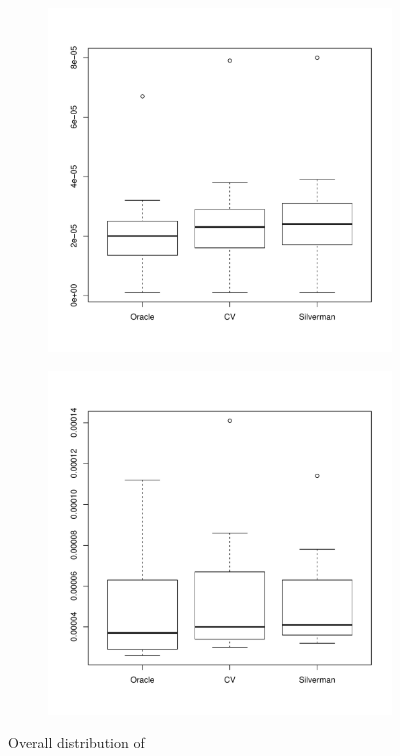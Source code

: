 \begin{figure}[htbp]
    \centering
    \begin{subfigure}[t]{0.45\textwidth}
        \includegraphics[width=\textwidth]{results/by_overall/normalized-miae-boxplot}
        \label{fig:discussion:overall_nmiae_boxplot:unif}
    \end{subfigure}
    \begin{subfigure}[t]{0.45\textwidth}
        \includegraphics[width=\textwidth]{results/by_overall/normalized-miae-peakpop-boxplot}
        \label{fig:discussion:overall_nmiae_boxplot:peak}
    \end{subfigure}
    \caption{Overall distribution of }
    \label{fig:discussion:overall_nmiae_boxplot}
\end{figure}

